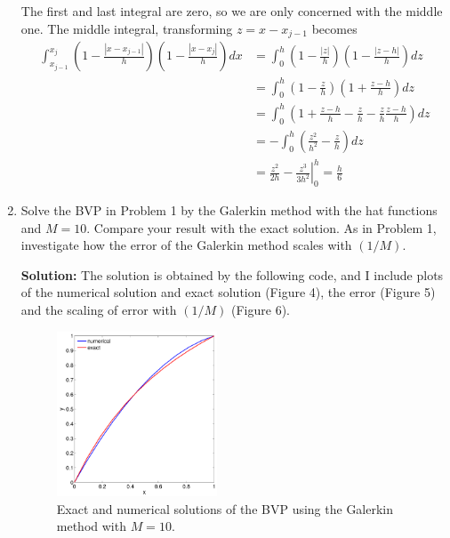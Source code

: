 \documentclass[11pt]{article}
\def\f{\frac }
\begin{document}
\begin{enumerate}

The first and last integral are zero, so we are only concerned with the middle one.
The middle integral, transforming $z = x-x_{j-1}$ becomes
\begin{align*} \int _{x_{j-1}} ^{x_{j}} \left ( 1- \f{|x-x_{j-1}|}{h}\right ) \left (  1- \f{|x-x_{j}|}{h}\right ) dx &=  \int _{0} ^{h} \left ( 1- \f{|z|}{h}\right ) \left (  1- \f{|z-h|}{h}\right ) dz \\
&=  \int _{0} ^{h} \left ( 1- \f{z}{h}\right ) \left (  1+ \f{z-h}{h}\right ) dz \\
&=  \int _{0} ^{h}\left ( 1 + \f{z-h}{h} - \f{z}{h} - \f{z}{h}\f{z-h}{h}\right ) dz \\
&=  -\int _{0} ^{h} \left ( \f{z^2}{h^2}-\f{z}{h}\right ) dz \\
&=  \left. \f{z^2}{2h}-\f{z^3}{3h^2} \right | _{0} ^{h} = \f{h}{6} \end{align*}


\item Solve the BVP in Problem 1 by the Galerkin method with the hat functions and $M=10$.
Compare your result with the exact solution.
As in Problem 1, investigate how the error of the Galerkin method scales with $(1/M)$.

\bigskip
\textbf{Solution:} The solution is obtained by the following code, and I include plots of the numerical solution and exact solution (Figure 4), the error (Figure 5) and the scaling of error with $(1/M)$ (Figure 6).



\begin{figure}[h!]
  \centering
    \includegraphics[width=0.45\textwidth]{andy_hw09_prb03_01_m10.pdf}
  \caption{Exact and numerical solutions of the BVP using the Galerkin method with $M=10$.}
\end{figure}


\end{enumerate}
\end{document}
